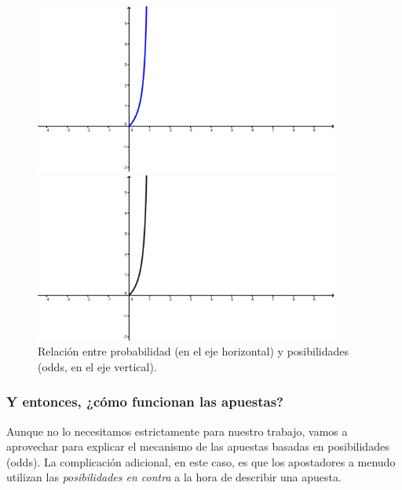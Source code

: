 \begin{figure}[h!]
\begin{center}
\begin{enColor}
\includegraphics[width=10cm]{../fig/Cap03-OddsVsProbabilidad.png}
\end{enColor}
\begin{bn}
\includegraphics[width=10cm]{../fig/Cap03-OddsVsProbabilidad-bn.png}
\end{bn}
  \caption{Relación entre probabilidad (en el eje horizontal) y posibilidades (odds, en el eje vertical).}
  \label{cap12:Fig:OddsVsProbabilidad}
\end{center}
\end{figure}




\subsubsection*{Y entonces, ¿cómo funcionan las apuestas?}

Aunque no lo necesitamos estrictamente para nuestro trabajo, vamos a aprovechar para explicar el mecanismo de las {\sf apuestas basadas en posibilidades (odds)}.  La complicación adicional, en este caso, es que los apostadores a menudo utilizan las {\em posibilidades en contra} a la hora  de describir una apuesta.

